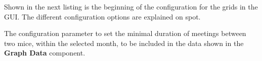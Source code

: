 \documentclass[a4paper,10pt,twoside,titlepage,headings=small,bibliography=totocnumbered,headsepline]{scrartcl}
\begin{document}
\begin{appendix}
Shown in the next listing is the beginning of the configuration for the grids in the GUI. The different configuration options are explained on spot.



The configuration parameter to set the minimal duration of meetings between two mice, within the selected month, to be included in the data shown in the \textbf{Graph Data} component. 



\newpage


\end{appendix}
\end{document}
